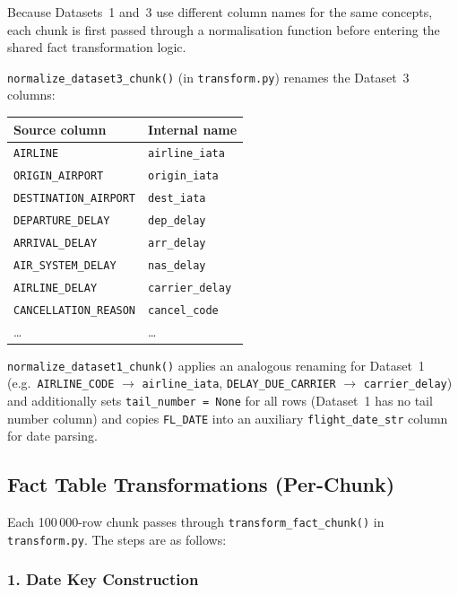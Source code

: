 \documentclass[12pt,a4paper]{article}
\begin{document}
Because Datasets~1 and~3 use different column names for the same concepts,
each chunk is first passed through a normalisation function before entering
the shared fact transformation logic.

\texttt{normalize\_dataset3\_chunk()} (in \texttt{transform.py}) renames the
Dataset~3 columns:

\begin{center}
\begin{tabular}{ll}
\toprule
\textbf{Source column} & \textbf{Internal name} \\
\midrule
\texttt{AIRLINE}             & \texttt{airline\_iata} \\
\texttt{ORIGIN\_AIRPORT}     & \texttt{origin\_iata} \\
\texttt{DESTINATION\_AIRPORT}& \texttt{dest\_iata} \\
\texttt{DEPARTURE\_DELAY}    & \texttt{dep\_delay} \\
\texttt{ARRIVAL\_DELAY}      & \texttt{arr\_delay} \\
\texttt{AIR\_SYSTEM\_DELAY}  & \texttt{nas\_delay} \\
\texttt{AIRLINE\_DELAY}      & \texttt{carrier\_delay} \\
\texttt{CANCELLATION\_REASON}& \texttt{cancel\_code} \\
\ldots & \ldots \\
\bottomrule
\end{tabular}
\end{center}

\texttt{normalize\_dataset1\_chunk()} applies an analogous renaming for
Dataset~1 (e.g.\ \texttt{AIRLINE\_CODE} $\to$ \texttt{airline\_iata},
\texttt{DELAY\_DUE\_CARRIER} $\to$ \texttt{carrier\_delay}) and additionally
sets \texttt{tail\_number = None} for all rows (Dataset~1 has no tail number
column) and copies \texttt{FL\_DATE} into an auxiliary
\texttt{flight\_date\_str} column for date parsing.

\subsection{Fact Table Transformations (Per-Chunk)}

Each 100\,000-row chunk passes through \texttt{transform\_fact\_chunk()} in
\texttt{transform.py}. The steps are as follows:

\subsubsection*{1. Date Key Construction}
\end{document}
